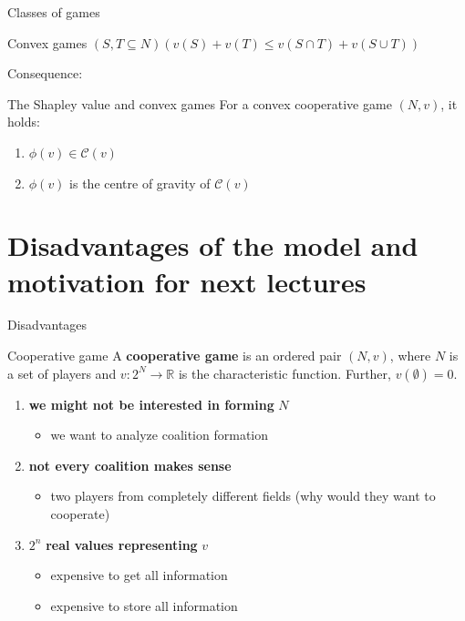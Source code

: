 \documentclass{beamer}
\begin{document}

\begin{frame}{Classes of games}
    \begin{block}{Convex games}
		$\left(S,T \subseteq N\right)\left(v(S)+v(T) \leq v\left(S \cap T\right)+v\left(S \cup T\right)\right)$
	\end{block}
	Consequence:
	\begin{block}{The Shapley value and  convex games}
		\pause
		For a convex cooperative game $(N,v)$, it holds:
		\begin{enumerate}
			\item $\phi(v) \in \mathcal{C}(v)$
			\item $\phi(v)$ is the centre of gravity of $\mathcal{C}(v)$
		\end{enumerate}
	\end{block}
\end{frame}


\section{Disadvantages of the model and motivation for next lectures}


\begin{frame}{Disadvantages}
    \begin{block}{Cooperative game}
        A \textbf{cooperative game} is an ordered pair $(N,v)$, where $N$ is a set of players and $v\colon 2^N \to \mathbb{R}$ is the characteristic function. Further, $v(\emptyset) = 0$.
    \end{block}
	\begin{enumerate}
		\item<2-> \textbf{we might not be interested in forming} $N$
		\begin{itemize}
			\item<3-> we want to analyze coalition formation
		\end{itemize}
		\item<4-> \textbf{not every coalition makes sense}
		\begin{itemize}
			\item<5-> two players from completely different fields (why would they want to cooperate)
		\end{itemize}
		\item<6-> $2^n$ \textbf{real values representing} $v$
		\begin{itemize}
			\item<7-> expensive to get all information
			\item<7-> expensive to store all information
		\end{itemize}
	\end{enumerate}
\end{frame}
\end{document}
